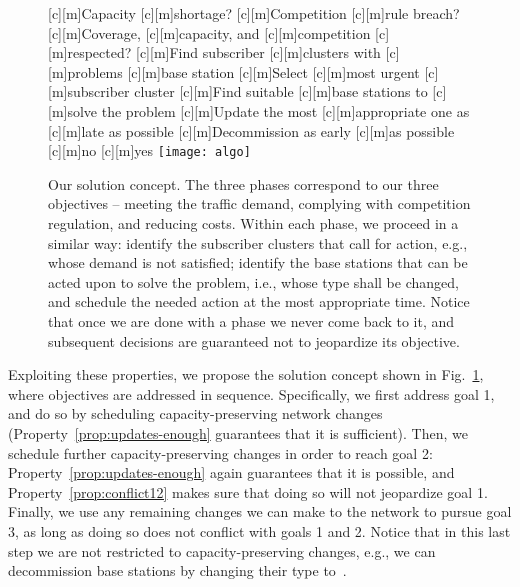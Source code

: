 \documentclass[10pt,journal,cspaper,compsoc]{IEEEtran}
\newcommand{\Fig}[1]{Fig.~\ref{fig:#1}}
\newcommand{\Prop}[1]{Property~\ref{prop:#1}}
\begin{document}
\begin{figure}[t!]
[c][m]{\scriptsize{Capacity}}
[c][m]{\scriptsize{shortage?}}
[c][m]{\scriptsize{Competition}}
[c][m]{\scriptsize{rule breach?}}
[c][m]{\scriptsize{Coverage,}}
[c][m]{\scriptsize{capacity, and}}
[c][m]{\scriptsize{competition}}
[c][m]{\scriptsize{respected?}}
[c][m]{\scriptsize{Find subscriber}}
[c][m]{\scriptsize{clusters with}}
[c][m]{\scriptsize{problems}}
[c][m]{\scriptsize{base station}}
[c][m]{\scriptsize{Select}}
[c][m]{\scriptsize{most urgent}}
[c][m]{\scriptsize{subscriber cluster}}
[c][m]{\scriptsize{Find suitable}}
[c][m]{\scriptsize{base stations to}}
[c][m]{\scriptsize{solve the problem}}
[c][m]{\scriptsize{Update the most}}
[c][m]{\scriptsize{appropriate one as}}
[c][m]{\scriptsize{late as possible}}
[c][m]{\scriptsize{Decommission as early}}
[c][m]{\scriptsize{as possible}}
[c][m]{\small{no}}
[c][m]{\small{yes}}
\centering
	\texttt{[image: algo]}
	\caption{Our solution concept. The three phases correspond to our three objectives -- meeting the traffic
	demand, complying with competition regulation, and reducing costs. Within each phase, we proceed in a similar way: identify
	the subscriber clusters that call for action, e.g., whose demand is not satisfied; identify the base stations that can
	be acted upon to solve the problem,
	i.e., whose type shall be changed, and
	schedule the needed action
	at the most appropriate time. Notice that once we are done with a phase we never come back to it, and subsequent
	decisions are guaranteed not to jeopardize its objective.}
	\label{fig:solution}
\end{figure}

Exploiting these properties, we propose the solution concept
shown in \Fig{solution}, where objectives are
addressed in sequence. Specifically, we first address
goal 1, and do so by
scheduling capacity-preserving network changes (\Prop{updates-enough} guarantees that it is sufficient).
Then, we schedule further capacity-preserving changes in order to reach goal 2: \Prop{updates-enough}
again guarantees that it is possible, and \Prop{conflict12} makes sure that doing so will not jeopardize goal 1.
Finally, we use any remaining changes we can make to the network to pursue goal 3,
as long as doing so does not conflict with goals 1 and 2. Notice that in this last step we are not restricted to capacity-preserving
changes, e.g., we can decommission base stations by changing their type to~.
\end{document}
